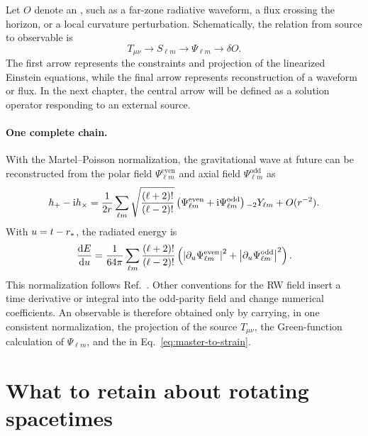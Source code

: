 Let $O$ denote an , such as a far-zone radiative waveform, a flux crossing the horizon, or a local curvature perturbation. Schematically, the relation from source to observable is
\begin{equation}
T_{\mu\nu}
\longrightarrow
S_{\ell m}
\longrightarrow
\Psi_{\ell m}
\longrightarrow
\delta O.
\label{eq:source-master-observable-chain}
\end{equation}
The first arrow represents the constraints and projection of the linearized Einstein equations, while the final arrow represents reconstruction of a waveform or flux. In the next chapter, the central arrow will be defined as a solution operator responding to an external source.

\paragraph{One complete chain.}
With the Martel--Poisson normalization, the gravitational wave at future  can be reconstructed from the polar field $\Psi^{\mathrm{even}}_{\ell m}$ and axial field $\Psi^{\mathrm{odd}}_{\ell m}$ as
\begin{equation}
h_+-\mathrm{i} h_\times
=
\frac{1}{2r}
\sum_{\ell m}
\sqrt{\frac{(\ell+2)!}{(\ell-2)!}}
\left(
\Psi^{\mathrm{even}}_{\ell m}
+\mathrm{i}\Psi^{\mathrm{odd}}_{\ell m}
\right)
{}_{-2}Y_{\ell m}
+O(r^{-2}).
\label{eq:master-to-strain}
\end{equation}
With $u=t-r_*$, the radiated energy is
\begin{equation}
\frac{\mathrm{d} E}{\mathrm{d} u}
=
\frac{1}{64\pi}
\sum_{\ell m}
\frac{(\ell+2)!}{(\ell-2)!}
\left(
\left|\partial_u\Psi^{\mathrm{even}}_{\ell m}\right|^2
+
\left|\partial_u\Psi^{\mathrm{odd}}_{\ell m}\right|^2
\right).
\label{eq:master-to-energy-flux}
\end{equation}
This normalization follows Ref.~\cite{Martel:2005ir}. Other conventions for the RW field insert a time derivative or integral into the odd-parity field and change numerical coefficients. An observable is therefore obtained only by carrying, in one consistent normalization, the projection of the source $T_{\mu\nu}$, the Green-function calculation of $\Psi_{\ell m}$, and the  in Eq.~\eqref{eq:master-to-strain}.

\section{What to retain about rotating spacetimes}

